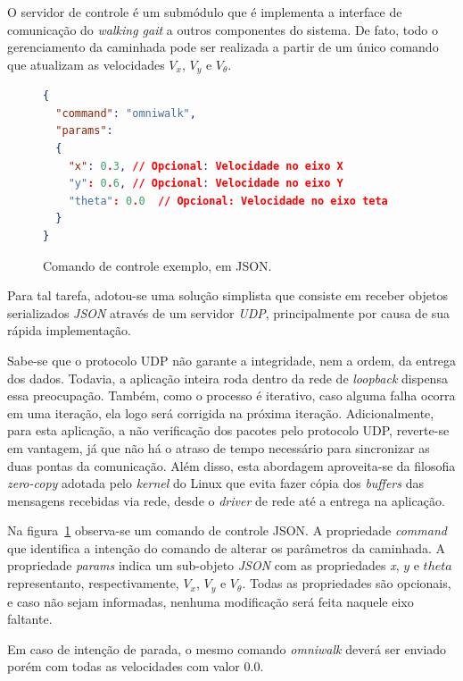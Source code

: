 O servidor de controle é um submódulo que é implementa a interface de comunicação do \textit{walking gait} a outros componentes do sistema. De fato, todo o gerenciamento da caminhada pode ser realizada a partir de um único comando que atualizam as velocidades $V_x$, $V_y$ e $V_\theta$.

\begin{figure}[htb]
	\begin{lstlisting}[language=json,firstnumber=1]
{
  "command": "omniwalk",
  "params":
  {
    "x": 0.3, // Opcional: Velocidade no eixo X
    "y": 0.6, // Opcional: Velocidade no eixo Y
    "theta": 0.0  // Opcional: Velocidade no eixo teta
  }
}
	\end{lstlisting}
	\caption{Comando de controle exemplo, em JSON.}
	\label{fig:architecture:walkinggait:controller:json}
\end{figure}

Para tal tarefa, adotou-se uma solução simplista que consiste em receber objetos serializados \textit{JSON} através de um servidor \textit{UDP}, principalmente por causa de sua rápida implementação.

Sabe-se que o protocolo UDP não garante a integridade, nem a ordem, da entrega dos dados. Todavia, a aplicação inteira roda dentro da rede de \textit{loopback} dispensa essa preocupação. Também, como o processo é iterativo, caso alguma falha ocorra em uma iteração, ela logo será corrigida na próxima iteração. Adicionalmente, para esta aplicação, a não verificação dos pacotes pelo protocolo UDP, reverte-se em vantagem, já que não há o atraso de tempo necessário para sincronizar as duas pontas da comunicação. Além disso, esta abordagem aproveita-se da filosofia \textit{zero-copy} adotada pelo \textit{kernel} do Linux \cite{tianhua2008} que evita fazer cópia dos \textit{buffers} das mensagens recebidas via rede, desde o \textit{driver} de rede até a entrega na aplicação.

Na figura~\ref{fig:architecture:walkinggait:controller:json} observa-se um comando de controle JSON. A propriedade \textit{command} que identifica a intenção do comando de alterar os parâmetros da caminhada. A propriedade \textit{params} indica um sub-objeto \textit{JSON} com as propriedades \textit{x}, $y$ e $theta$ representanto, respectivamente, $V_x$, $V_y$ e $V_\theta$. Todas as propriedades são opcionais, e caso não sejam informadas, nenhuma modificação será feita naquele eixo faltante.

Em caso de intenção de parada, o mesmo comando \textit{omniwalk} deverá ser enviado porém com todas as velocidades com valor $0.0$.

